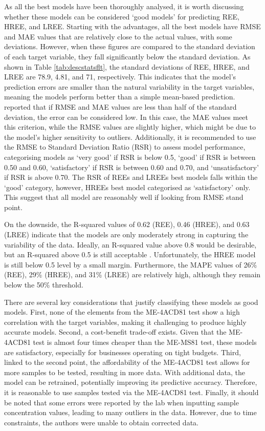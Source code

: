 \documentclass[11pt,a4paper,]{article}
\begin{document}
As all the best models have been thoroughly analysed, it is worth discussing whether these models can be considered `good models' for predicting REE, HREE, and LREE. Starting with the advantages, all the best models have RMSE and MAE values that are relatively close to the actual values, with some deviations. However, when these figures are compared to the standard deviation of each target variable, they fall significantly below the standard deviation. As shown in Table \ref{tab:descstatsflt}, the standard deviations of REE, HREE, and LREE are 78.9, 4.81, and 71, respectively. This indicates that the model's prediction errors are smaller than the natural variability in the target variables, meaning the models perform better than a simple mean-based prediction. \textcite{Moriasi2007} reported that if RMSE and MAE values are less than half of the standard deviation, the error can be considered low. In this case, the MAE values meet this criterion, while the RMSE values are slightly higher, which might be due to the model's higher sensitivity to outliers. Additionally, it is recommended to use the RMSE to Standard Deviation Ratio (RSR) to assess model performance, categorising models as `very good' if RSR is below 0.5, `good' if RSR is between 0.50 and 0.60, `satisfactory' if RSR is between 0.60 and 0.70, and `unsatisfactory' if RSR is above 0.70. The RSR of REEs and LREEs best models falls within the `good' category, however, HREEs best model categorised as `satisfactory' only. This suggest that all model are reasonably well if looking from RMSE stand point.

On the downside, the R-squared values of 0.62 (REE), 0.46 (HREE), and 0.63 (LREE) indicate that the models are only moderately strong in capturing the variability of the data. Ideally, an R-squared value above 0.8 would be desirable, but an R-squared above 0.5 is still acceptable \autocite{Moriasi2007}. Unfortunately, the HREE model is still below 0.5 level by a small margin. Furthermore, the MAPE values of 26\% (REE), 29\% (HREE), and 31\% (LREE) are relatively high, although they remain below the 50\% threshold.

There are several key considerations that justify classifying these models as good models. First, none of the elements from the ME-4ACD81 test show a high correlation with the target variables, making it challenging to produce highly accurate models. Second, a cost-benefit trade-off exists. Given that the ME-4ACD81 test is almost four times cheaper than the ME-MS81 test, these models are satisfactory, especially for businesses operating on tight budgets. Third, linked to the second point, the affordability of the ME-4ACD81 test allows for more samples to be tested, resulting in more data. With additional data, the model can be retrained, potentially improving its predictive accuracy. Therefore, it is reasonable to use samples tested via the ME-4ACD81 test. Finally, it should be noted that some errors were reported by the lab when inputting sample concentration values, leading to many outliers in the data. However, due to time constraints, the authors were unable to obtain corrected data.
\end{document}
